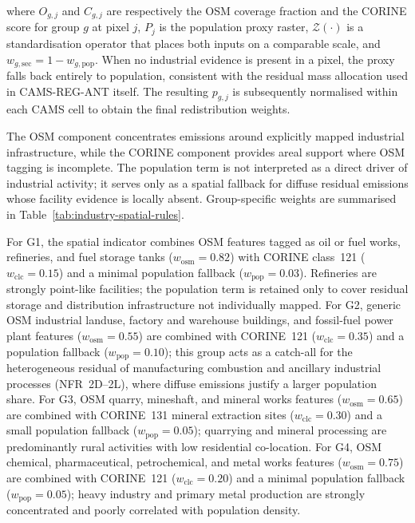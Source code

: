 %
where $O_{g,j}$ and $C_{g,j}$ are respectively the OSM coverage fraction and the
CORINE score for group $g$ at pixel $j$, $P_j$ is the population proxy raster,
$\mathcal{Z}(\cdot)$ is a standardisation operator that places both inputs on a
comparable scale, and $w_{g,\mathrm{sec}} = 1 - w_{g,\mathrm{pop}}$. When no
industrial evidence is present in a pixel, the proxy falls back entirely to population,
consistent with the residual mass allocation used in \mbox{CAMS-REG-ANT} itself. The
resulting $p_{g,j}$ is subsequently normalised within each CAMS cell to obtain the
final redistribution weights.

The OSM component concentrates emissions around explicitly mapped industrial
infrastructure, while the CORINE component provides areal support where OSM tagging is
incomplete. The population term is not interpreted as a direct driver of industrial
activity; it serves only as a spatial fallback for diffuse residual emissions whose
facility evidence is locally absent. Group-specific weights are summarised in
Table~\ref{tab:industry-spatial-rules}.

For G1, the spatial indicator combines OSM features tagged as oil or fuel works,
refineries, and fuel storage tanks ($w_{\mathrm{osm}} = 0.82$) with CORINE class~121
($w_{\mathrm{clc}} = 0.15$) and a minimal population fallback
($w_{\mathrm{pop}} = 0.03$). Refineries are strongly point-like facilities; the
population term is retained only to cover residual storage and distribution
infrastructure not individually mapped. For G2, generic OSM industrial landuse,
factory and warehouse buildings, and fossil-fuel power plant features
($w_{\mathrm{osm}} = 0.55$) are combined with CORINE~121 ($w_{\mathrm{clc}} = 0.35$)
and a population fallback ($w_{\mathrm{pop}} = 0.10$); this group acts as a catch-all
for the heterogeneous residual of manufacturing combustion and ancillary industrial
processes (NFR~2D--2L), where diffuse emissions justify a larger population share. For
G3, OSM quarry, mineshaft, and mineral works features ($w_{\mathrm{osm}} = 0.65$) are
combined with CORINE~131 mineral extraction sites ($w_{\mathrm{clc}} = 0.30$) and a
small population fallback ($w_{\mathrm{pop}} = 0.05$); quarrying and mineral
processing are predominantly rural activities with low residential co-location. For G4,
OSM chemical, pharmaceutical, petrochemical, and metal works features
($w_{\mathrm{osm}} = 0.75$) are combined with CORINE~121 ($w_{\mathrm{clc}} = 0.20$)
and a minimal population fallback ($w_{\mathrm{pop}} = 0.05$); heavy industry and
primary metal production are strongly concentrated and poorly correlated with
population density.

